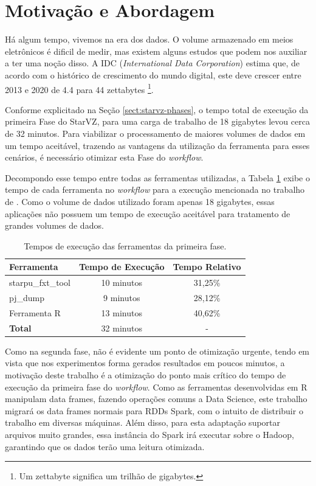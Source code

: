 \section{Motivação e Abordagem}\label{sect:motivation}

Há algum tempo, vivemos na era dos dados. O volume armazenado em 
meios eletrônicos é dificil de medir, mas existem alguns estudos que podem nos 
auxiliar a ter uma noção disso. A IDC (\textit{International 
Data Corporation}) \cite{ref:idcdigitaluniverse} estima que, de acordo com o histórico de crescimento do mundo digital, este deve crescer entre 2013 e 2020 de 4.4 para 44 zettabytes \footnote{Um zettabyte significa um trilhão de gigabytes.}.

Conforme explicitado na Seção \ref{sect:starvz-phases}, o tempo total de execução da primeira Fase do StarVZ, para uma carga de trabalho de 18 gigabytes levou cerca de 32 minutos. Para viabilizar o processamento de maiores volumes de dados em um tempo aceitável, trazendo as vantagens da utilização da ferramenta para esses cenários, 
é necessário otimizar esta Fase do \emph{workflow}.  

Decompondo esse tempo entre todas as ferramentas utilizadas, a Tabela \ref{tab:exectimes} exibe o tempo de cada ferramenta no \textit{workflow} para a execução mencionada no trabalho de \citet{ref:starvz}. Como o volume de dados utilizado foram apenas 18 gigabytes, essas aplicações não possuem um tempo de execução aceitável para tratamento
de grandes volumes de dados.

\begin{table}[H]
\centering
\begin{tabular}{l c c} \toprule
\textbf{Ferramenta}  &  \textbf{Tempo de Execução}  & \textbf{Tempo Relativo}\\ \midrule
starpu\_fxt\_tool     & 10 minutos   & 31,25\%  \\
pj\_dump            & 9 minutos    & 28,12\%     \\
Ferramenta R        & 13 minutos   & 40,62\%      \\
\textbf{Total}     & 32 minutos & -
\end{tabular}
\caption{Tempos de execução das ferramentas da primeira fase.}
\label{tab:exectimes}
\end{table}

Como na segunda fase, não é evidente um ponto de otimização urgente, tendo em 
vista que nos experimentos forma gerados resultados em poucos minutos, a motivação deste trabalho é a otimização do ponto mais crítico do tempo de execução da primeira fase do \emph{workflow}. Como as ferramentas desenvolvidas em R manipulam data frames, fazendo 
operações comuns a Data Science, este trabalho migrará os data frames normais para RDDs 
Spark, com o intuito de distribuir o trabalho em diversas máquinas. Além disso, 
para esta adaptação suportar arquivos muito grandes, essa instância do Spark irá
executar sobre o Hadoop, garantindo que os dados terão uma leitura otimizada.